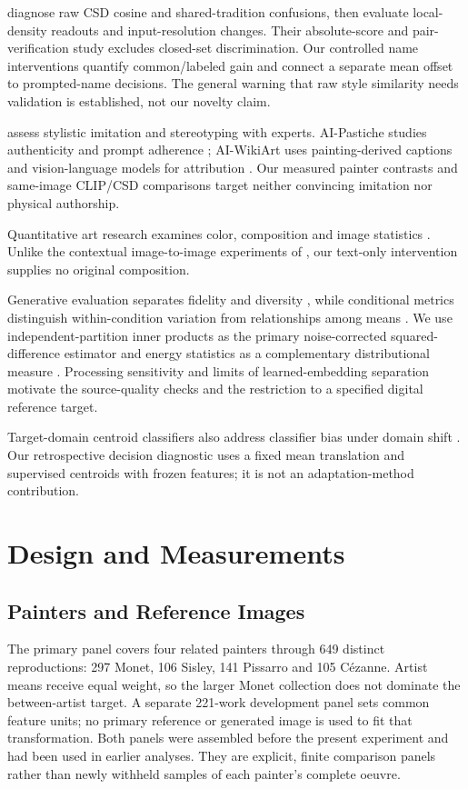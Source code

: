 \citet{frochte2026csd} diagnose raw CSD cosine and shared-tradition confusions,
then evaluate local-density readouts and input-resolution changes. Their
absolute-score and pair-verification study excludes closed-set discrimination.
Our controlled name interventions quantify common/labeled gain and connect a
separate mean offset to prompted-name decisions. The general warning that raw
style similarity needs validation is established, not our novelty claim.

\citet{deliege2025} assess stylistic imitation and stereotyping with experts.
AI-Pastiche studies authenticity and prompt adherence \citep{asperti2025pastiche};
AI-WikiArt uses painting-derived captions and vision-language models for
attribution \citep{fu2025aiwikiart}. Our measured painter contrasts and same-image
CLIP/CSD comparisons target neither convincing imitation nor physical authorship.

Quantitative art research examines color, composition and image statistics
\citep{kim2014,sigaki2018,lee2020}. Unlike the contextual image-to-image
experiments of \citet{kim2026}, our text-only intervention supplies no original
composition.

Generative evaluation separates fidelity and diversity \citep{naeem2020},
while conditional metrics distinguish within-condition variation from relationships
among means \citep{benny2021conditional}. We use independent-partition inner products
as the primary noise-corrected squared-difference estimator \citep{diedrichsen2017representational}
and energy statistics as a complementary distributional measure \citep{szekely2013}.
Processing sensitivity \citep{parmar2022} and limits of learned-embedding
separation \citep{asperti2026} motivate the source-quality checks and the
restriction to a specified digital reference target.

Target-domain centroid classifiers also address classifier bias under domain
shift \citep{liang2021atdoc}. Our retrospective decision diagnostic uses a fixed
mean translation and supervised centroids with frozen features; it is not an
adaptation-method contribution.

\section{Design and Measurements}\label{sec:design}
\subsection{Painters and Reference Images}
The primary panel covers four related painters through 649 distinct reproductions: 297 Monet,
106 Sisley, 141 Pissarro and 105 C\'ezanne. Artist means receive equal weight,
so the larger Monet collection does not dominate the between-artist target.
A separate 221-work development panel sets common feature units; no primary
reference or generated image is used to fit that transformation. Both panels
were assembled before the present experiment and had been used in earlier
analyses. They are explicit, finite comparison panels rather than newly withheld
samples of each painter's complete oeuvre.

